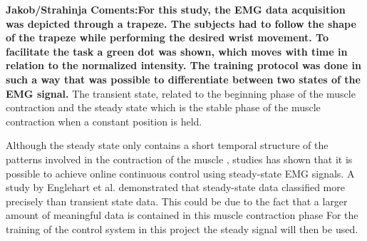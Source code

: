 \textbf{Jakob/Strahinja Coments:For this study, the EMG data acquisition was depicted through a trapeze. The subjects had to follow the shape of the trapeze while performing the desired wrist movement. To facilitate the task a green dot was shown, which moves with time in relation to the normalized intensity. The training protocol was done in such a way that was possible to differentiate between two states of the EMG signal.} The transient state, related to the beginning phase of the muscle contraction and the steady state which is the stable phase of the muscle contraction when a constant position is held. \cite{mobarak2014}

Although the steady state only contains a short temporal structure of the patterns involved in the contraction of the muscle \cite{mobarak}, studies has shown that it is possible to achieve online continuous control using steady-state EMG signals. A study by Englehart et al. \cite{englehart} demonstrated that steady-state data classified more precisely than transient state data. This could be due to the fact that a larger amount of meaningful data is contained in this muscle contraction phase \cite{mobarak} For the training of the control system  in this project the steady signal will then be used. %




